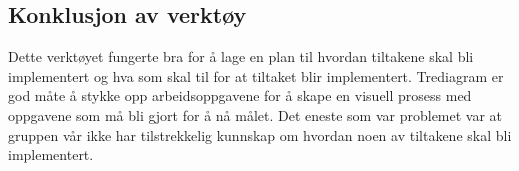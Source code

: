 \subsection{Konklusjon av verktøy}
Dette verktøyet fungerte bra for å lage en plan til hvordan tiltakene skal bli implementert og hva som skal til for at tiltaket blir implementert. Trediagram er god måte å stykke opp arbeidsoppgavene for å skape en visuell prosess med oppgavene som må bli gjort for å nå målet. Det eneste som var problemet var at gruppen vår ikke har tilstrekkelig kunnskap om hvordan noen av tiltakene skal bli implementert.